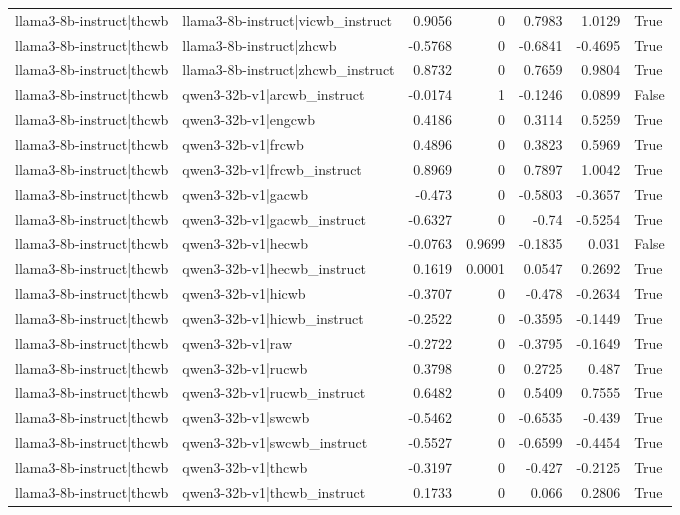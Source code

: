 \begin{table}
\begin{tabular}{l l r r r r l}
llama3-8b-instruct|thcwb & llama3-8b-instruct|vicwb_instruct & 0.9056 & 0 & 0.7983 & 1.0129 & True \\
llama3-8b-instruct|thcwb & llama3-8b-instruct|zhcwb & -0.5768 & 0 & -0.6841 & -0.4695 & True \\
llama3-8b-instruct|thcwb & llama3-8b-instruct|zhcwb_instruct & 0.8732 & 0 & 0.7659 & 0.9804 & True \\
llama3-8b-instruct|thcwb & qwen3-32b-v1|arcwb_instruct & -0.0174 & 1 & -0.1246 & 0.0899 & False \\
llama3-8b-instruct|thcwb & qwen3-32b-v1|engcwb & 0.4186 & 0 & 0.3114 & 0.5259 & True \\
llama3-8b-instruct|thcwb & qwen3-32b-v1|frcwb & 0.4896 & 0 & 0.3823 & 0.5969 & True \\
llama3-8b-instruct|thcwb & qwen3-32b-v1|frcwb_instruct & 0.8969 & 0 & 0.7897 & 1.0042 & True \\
llama3-8b-instruct|thcwb & qwen3-32b-v1|gacwb & -0.473 & 0 & -0.5803 & -0.3657 & True \\
llama3-8b-instruct|thcwb & qwen3-32b-v1|gacwb_instruct & -0.6327 & 0 & -0.74 & -0.5254 & True \\
llama3-8b-instruct|thcwb & qwen3-32b-v1|hecwb & -0.0763 & 0.9699 & -0.1835 & 0.031 & False \\
llama3-8b-instruct|thcwb & qwen3-32b-v1|hecwb_instruct & 0.1619 & 0.0001 & 0.0547 & 0.2692 & True \\
llama3-8b-instruct|thcwb & qwen3-32b-v1|hicwb & -0.3707 & 0 & -0.478 & -0.2634 & True \\
llama3-8b-instruct|thcwb & qwen3-32b-v1|hicwb_instruct & -0.2522 & 0 & -0.3595 & -0.1449 & True \\
llama3-8b-instruct|thcwb & qwen3-32b-v1|raw & -0.2722 & 0 & -0.3795 & -0.1649 & True \\
llama3-8b-instruct|thcwb & qwen3-32b-v1|rucwb & 0.3798 & 0 & 0.2725 & 0.487 & True \\
llama3-8b-instruct|thcwb & qwen3-32b-v1|rucwb_instruct & 0.6482 & 0 & 0.5409 & 0.7555 & True \\
llama3-8b-instruct|thcwb & qwen3-32b-v1|swcwb & -0.5462 & 0 & -0.6535 & -0.439 & True \\
llama3-8b-instruct|thcwb & qwen3-32b-v1|swcwb_instruct & -0.5527 & 0 & -0.6599 & -0.4454 & True \\
llama3-8b-instruct|thcwb & qwen3-32b-v1|thcwb & -0.3197 & 0 & -0.427 & -0.2125 & True \\
llama3-8b-instruct|thcwb & qwen3-32b-v1|thcwb_instruct & 0.1733 & 0 & 0.066 & 0.2806 & True \\

\end{tabular}
\end{table}
